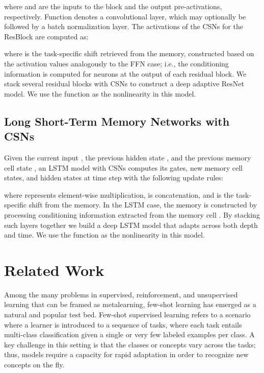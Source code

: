 \documentclass{article}
\begin{document}
where  and  are the inputs to the block and the output pre-activations, respectively. Function  denotes a convolutional layer, which may optionally be followed by 
a batch normalization \cite{ioffe2015batchnorm} layer. The activations  of the CSNs for the ResBlock are computed as:

where  is the task-specific shift retrieved from the memory, constructed based on the activation values  analogously to the FFN case; i.e., the conditioning information is computed for neurons at the output of each residual block. We stack several residual blocks with CSNs to construct a deep adaptive ResNet model. 
We use the  function as the nonlinearity  in this model.


\subsection{ Long Short-Term Memory Networks with CSNs}
\label{ada_lstm}
Given the current input , the previous hidden state , and the previous memory cell state , an LSTM model with CSNs computes its gates, new memory cell states, and hidden states at time step  with the following update rules:

where  represents element-wise multiplication,  is concatenation, and  is the task-specific shift from the memory. In the LSTM case, the memory is constructed by processing conditioning information extracted from the memory cell . By stacking such layers together we build a deep LSTM model that adapts across both depth and time. 
We use the  function as the nonlinearity  in this model.

\section{Related Work}
\label{related work}

Among the many problems in supervised, reinforcement, and unsupervised learning that can be framed as metalearning, few-shot learning has emerged as a natural and popular test bed.
Few-shot supervised learning refers to a scenario where a learner is introduced to a sequence of tasks, where each task entails multi-class classification given a single or very few labeled examples per class. A key challenge in this setting is that the classes or concepts vary across the tasks; thus, models require a capacity for rapid adaptation in order to recognize new concepts on the fly.
\end{document}
